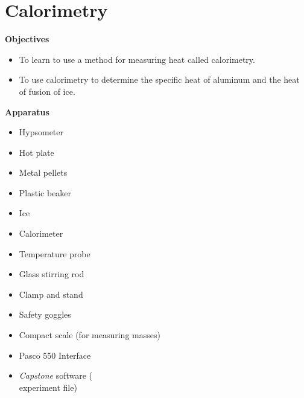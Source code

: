 \section{Calorimetry}

\makelabheader %

\bigskip
\textbf{Objectives}
\begin{itemize}[nosep]%
\item To learn to use a method for measuring heat called calorimetry.
\item To use calorimetry to determine the specific heat of aluminum and
the heat of fusion of ice.
\end{itemize}

\begin{minipage}{0.39\textwidth}

\bigskip
\textbf{Apparatus}
\begin{itemize}[itemsep=1pt]%
\item Hypsometer
\item Hot plate 
\item Metal pellets 
\item Plastic beaker
\item Ice 
\item Calorimeter
\item Temperature probe
\item Glass stirring rod
\item Clamp and stand
\item Safety goggles
\item Compact scale (for measuring masses)
\item Pasco 550 Interface
\item \textit{Capstone} software ( \\ experiment file)
\end{itemize}
\end{minipage}
